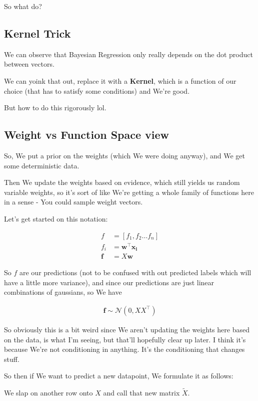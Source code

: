 \documentclass{article}
\begin{document}
		So what do?
		
	\subsection{Kernel Trick}
	
		We can observe that Bayesian Regression only really depends on the dot product between vectors.
		
		We can yoink that out, replace it with a \textbf{Kernel}, which is a function of our choice (that has to satisfy some conditions) and We're good.
		
		But how to do this rigorously lol.
		
	\subsection{Weight vs Function Space view}
	
		So, We put a prior on the weights (which We were doing anyway), and We get some deterministic data.
		
		Then We update the weights based on evidence, which still  yields us random variable weights, so it's sort of like We're getting a whole family of functions here in a sense - You could sample weight vectors.
		
		Let's get started on this notation:
		
		\begin{align}
			f &= [f_1, f_2\ldots f_n]\\
			f_i &= \mathbf{w^\top x_i}\\
			\mathbf{f} &= X\mathbf{w}
		\end{align}
		
		So $f$ are our predictions (not to be confused with out predicted labels which will have a little more variance), and since our predictions are just linear combinations of gaussians, so We have 
		
		\begin{align}
			\mathbf{f}\sim\mathcal{N}(0, XX^\top)
		\end{align}
		
		So obviously this is a bit weird since We aren't updating the weights here based on the data, is what I'm seeing, but that'll hopefully clear up later. I think it's because We're not conditioning in anything. It's the conditioning that changes stuff.
		
		So then if We want to predict a new datapoint, We formulate it as follows:
		
		We slap on another row onto $X$ and call that new matrix $\tilde{X}$.
		
\end{document}
